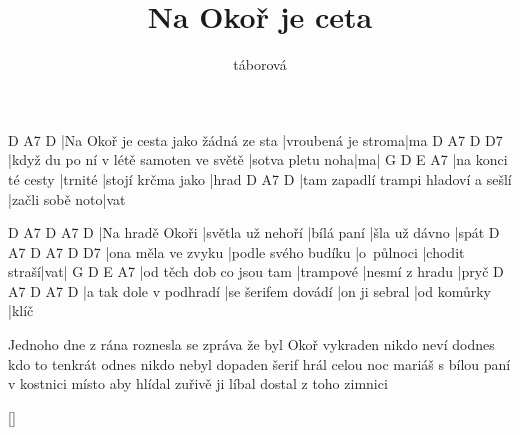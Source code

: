 \documentclass{song}
\title{Na Okoř je ceta}
\author{táborová}
\begin{document}
\strophe
D                                   A7                 D
|Na Okoř je cesta jako žádná ze sta |vroubená je stroma|ma
D                                      A7               D  D7
|když du po ní v létě samoten ve světě |sotva pletu noha|ma|
G                  D       E                 A7
|na konci té cesty |trnité |stojí krčma jako |hrad
D                                   A7              D
|tam zapadlí trampi hladoví a sešlí |začli sobě noto|vat
\endstrophe

D               A7                D          A7            D
|Na hradě Okoři |světla už nehoří |bílá paní |šla už dávno |spát
D                  A7                  D          A7            D   D7
|ona měla ve zvyku |podle svého budíku |o~půlnoci |chodit straší|vat|
G                        D         E              A7
|od těch dob co jsou tam |trampové |nesmí z hradu |pryč
D                      A7                 D             A7          D
|a tak dole v podhradí |se šerifem dovádí |on ji sebral |od komůrky |klíč
\endstrophe

\strophe*
Jednoho dne z rána roznesla se zpráva že byl Okoř vykraden
nikdo neví dodnes kdo to tenkrát odnes nikdo nebyl dopaden
šerif hrál celou noc mariáš s bílou paní v kostnici
místo aby hlídal zuřivě ji líbal dostal z toho zimnici
\endstrophe

\ref{}
\end{document}
